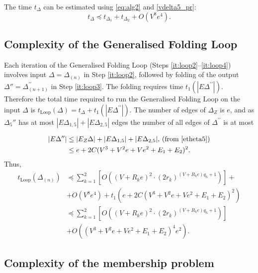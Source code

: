 \documentclass[a4paper,12pt]{article}
\newcommand{\D}{\Delta }
\numberwithin{equation}{section}
\numberwithin{figure}{section}
\newcommand{\Loop}{\operatorname{Loop}}
\begin{document}
The time $t_{\D}$ can be estimated using \eqref{eq:alg2} and \eqref{vdelta5_pr}:
\begin{equation}\label{eq:tdelta}
t_{\D}
\preceq t_{\D_1}+ t_{\D_2}+O(V^8e^4).
\end{equation}


\subsection{Complexity of the Generalised Folding Loop}\label{sub:loop}
Each iteration of the Generalised Folding Loop 
(Steps \ref{it:loop2}--\ref{it:loop4}) involves input $\D=\D_{(n)}$
in Step \ref{it:loop2}, followed by
folding of the output $\D''=\D^{\prime\prime}_{(n+1)}$ in Step \ref{it:loop3}. 
The folding requires time $t_1(|E\D^{\prime\prime}|)$. Therefore the
total time required to run the Generalised Folding Loop on the input $\D$ is
 $t_{\Loop}(\D)= t_{\D}+t_1(|E\D^{\prime\prime}|)$.
 The number of edges of $\D_Z$ is $e$,
and as $\D_5''$ has at most  $|E\D_{1,5}|+|E\D_{2,5}|$ edges the number of all edges of $\D^{\prime\prime}$ is at most

\begin{align}\label{edelta5_pr}
|E\D^{\prime\prime}|&\le |E_Z\D| +|E\D_{1,5}|+|E\D_{2,5}|, \, 
(\textrm{from \eqref{etheta5}})\notag\\
&\le e + 2C(V^3+V^2e+Ve^2+E_1+E_2)^2.
\end{align}
Thus,
\begin{equation}\label{tloop}
\begin{split}
t_{\Loop}(\D_{(n)}) &\preceq \sum_{k=1}^2[ O((V +R_k e)^2\cdot (2r_k)^{(V + R_k e) q_k +1})]+ \\
&+O(V^8e^4)+t_1(e + 2C(V^3+V^2e+Ve^2+E_1+E_2)^2)\\
&\preceq \sum_{k=1}^2[ O((V +R_k e)^2\cdot (2r_k)^{(V + R_k e) q_k +1})]\\
&+O((V^3+V^2e+Ve^2+E_1+E_2)^4e^2).
\end{split} 
\end{equation}

\subsection{Complexity of the membership problem}\label{sub:mp_complexity}
\end{document}
